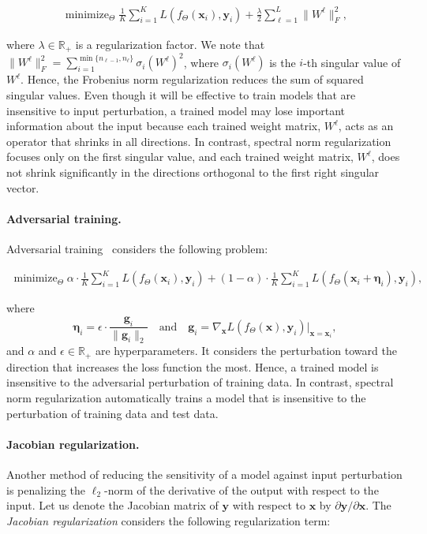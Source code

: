 \begin{align}
  \mathop{\text{minimize}}_{\Theta} \frac{1}{K}\sum_{i=1}^K L(f_\Theta({\bm x}_i),{\bm y}_i) + \frac{\lambda}{2}\sum_{\ell=1}^L\|W^\ell\|_F^2,
  \label{eq:weight-decay}
\end{align}

where $\lambda \in \mathbb{R}_+$ is a regularization factor. We note that $\|W^\ell\|_F^2 = \sum_{i=1}^{\min\{n_{\ell-1},n_\ell\}}\sigma_i(W^\ell)^2$, where $\sigma_i(W^\ell)$ is the $i$-th singular value of $W^\ell$.
Hence, the Frobenius norm regularization reduces the sum of squared singular values. Even though it will be effective to train models that are  insensitive to input perturbation, a trained model may lose important information about the input because each trained weight matrix, $W^\ell$, acts as an operator that shrinks in all directions. In contrast, spectral norm regularization focuses only on the first singular value, and each trained weight matrix, $W^\ell$, does not shrink significantly in the directions orthogonal to the first right singular vector.

\paragraph{Adversarial training.}

Adversarial training~\cite{Goodfellow:2015tl} considers the following problem:

\begin{align}
  \mathop{\text{minimize}}_{\Theta} \alpha \cdot \frac{1}{K}\sum_{i=1}^K L(f_\Theta({\bm x}_i),{\bm y}_i) + (1-\alpha) \cdot \frac{1}{K}\sum_{i=1}^K L(f_\Theta({\bm x}_i + {\bm \eta}_i), {\bm y}_i)\label{eq:adversarial},
\end{align}

where
\[
  {\bm \eta}_i = \epsilon \cdot \frac{{\bm g}_i}{\|{\bm g}_i\|_2} \quad \text{and} \quad {\bm g}_i = \nabla_{{\bm x}} L(f_{\Theta}({\bm x}),{\bm y}_i)|_{{\bm x} = {\bm x}_i},
\]
and $\alpha$ and $\epsilon \in \mathbb{R}_+$ are hyperparameters. It considers the perturbation toward the direction that increases the loss function the most. Hence, a trained model is insensitive to the adversarial perturbation of training data. In contrast, spectral norm regularization automatically trains a model that is insensitive to the perturbation of training data and test data.

\paragraph{Jacobian regularization.} Another method of reducing the sensitivity of a model against input perturbation is penalizing the $\ell_2$-norm of the derivative of the output with respect to the input. Let us denote the Jacobian matrix of ${\bm y}$ with respect to ${\bm x}$ by $\partial {\bm y} / \partial {\bm x}$. The \emph{Jacobian regularization} considers the following regularization term:

